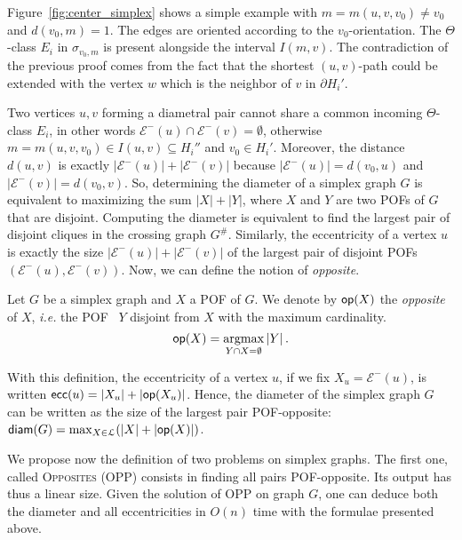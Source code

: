 \documentclass[a4paper,UKenglish,numberwithinsect,cleveref, autoref]{lipics-v2021}
\DeclareMathOperator*{\argmax}{argmax}
\newcommand{\card}[1]{\left| #1 \right|}
\newcommand{\diam}{\mbox{\textsf{diam}}}
\newcommand{\ecc}{\mbox{\textsf{ecc}}}
\newcommand{\opp}{\mbox{\textsf{op}}}
\begin{document}
Figure~\ref{fig:center_simplex} shows a simple example with $m=m(u,v,v_0)\neq v_0$ and $d(v_0,m) = 1$. The edges are oriented according to the $v_0$-orientation. The $\Theta$-class $E_i$ in $\sigma_{v_0,m}$ is present alongside the interval $I(m,v)$. The contradiction of the previous proof comes from the fact that the shortest $(u,v)$-path could be extended with the vertex $w$ which is the neighbor of $v$ in $\partial H_i'$.

Two vertices $u,v$ forming a diametral pair cannot share a common incoming $\Theta$-class $E_i$, in other words $\mathcal{E}^-(u) \cap \mathcal{E}^-(v) = \emptyset$, otherwise $m = m(u,v,v_0) \in I(u,v) \subseteq H_i''$ and $v_0 \in H_i'$. Moreover, the distance $d(u,v)$ is exactly $\card{\mathcal{E}^-(u)} + \card{\mathcal{E}^-(v)}$ because $\card{\mathcal{E}^-(u)} = d(v_0,u)$ and $\card{\mathcal{E}^-(v)} = d(v_0,v)$. So, determining the diameter of a simplex graph $G$ is equivalent to maximizing the sum $\card{X} + \card{Y}$, where $X$ and $Y$ are two POFs of $G$ that are disjoint. Computing the diameter is equivalent to find the largest pair of disjoint cliques in the crossing graph $G^{\#}$. Similarly, the eccentricity of a vertex $u$ is exactly the size $\card{\mathcal{E}^-(u)} + \card{\mathcal{E}^-(v)}$ of the largest pair of disjoint POFs $(\mathcal{E}^-(u),\mathcal{E}^-(v))$.
Now, we can define the notion of \textit{opposite}.

\begin{definition}
Let $G$ be a simplex graph and $X$ a POF of $G$. We denote by $\opp(X)$ the \textit{opposite} of $X$, {\em i.e.} the POF~ $Y$ disjoint from $X$ with the maximum cardinality.
\[
\opp(X) = \argmax_{Y \cap X = \emptyset} \card{Y}.
\]
\label{def:opposite}
\end{definition}

With this definition, the eccentricity of a vertex $u$, if we fix $X_u = \mathcal{E}^-(u)$, is written $\ecc(u) = \card{X_u} + \card{\opp(X_u)}$. Hence, the diameter of the simplex graph $G$ can be written as the size of the largest pair POF-opposite: $\diam(G) = \max_{X\in \mathcal{L}}( \card{X} + \card{\opp(X)})$.

We propose now the definition of two problems on simplex graphs. The first one, called \textsc{Opposites} (OPP) consists in finding all pairs POF-opposite. Its output has thus a linear size. Given the solution of OPP on graph $G$, one can deduce both the diameter and all eccentricities in $O(n)$ time with the formulae presented above.
\end{document}
